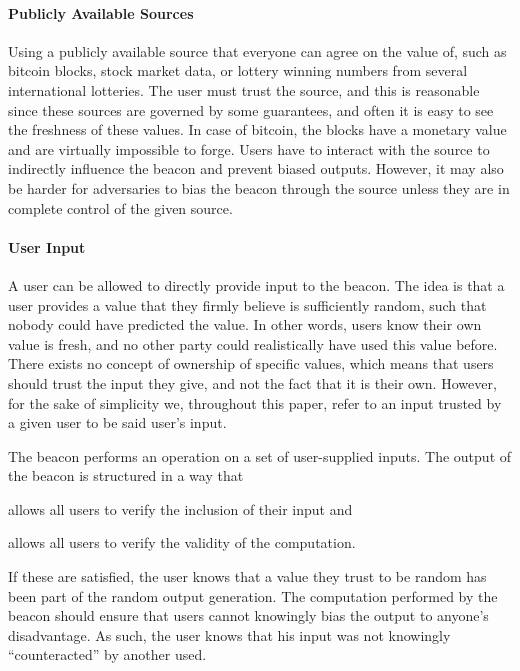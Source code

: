 \paragraph{Publicly Available Sources}
Using a publicly available source that everyone can agree on the value of, such as bitcoin blocks, stock market data, or lottery winning numbers from several international lotteries.
The user must trust the source, and this is reasonable since these sources are governed by some guarantees, and often it is easy to see the freshness of these values.
In case of bitcoin, the blocks have a monetary value and are virtually impossible to forge.
Users have to interact with the source to indirectly influence the beacon and prevent biased outputs.
However, it may also be harder for adversaries to bias the beacon through the source unless they are in complete control of the given source.

\paragraph{User Input}
A user can be allowed to directly provide input to the beacon.
The idea is that a user provides a value that they firmly believe is sufficiently random, such that nobody could have predicted the value.
In other words, users know their own value is fresh, and no other party could realistically have used this value before.
There exists no concept of ownership of specific values, which means that users should trust the input they give, and not the fact that it is their own.
However, for the sake of simplicity we, throughout this paper, refer to an input trusted by a given user to be said user's input.

The beacon performs an operation on a set of user-supplied inputs.
The output of the beacon is structured in a way that
\begin{eletterate*}
    \item allows all users to verify the inclusion of their input and
    \item allows all users to verify the validity of the computation.
\end{eletterate*}

If these are satisfied, the user knows that a value they trust to be random has been part of the random output generation.
The computation performed by the beacon should ensure that users cannot knowingly bias the output to anyone's disadvantage.
As such, the user knows that his input was not knowingly \enquote{counteracted} by another used.

